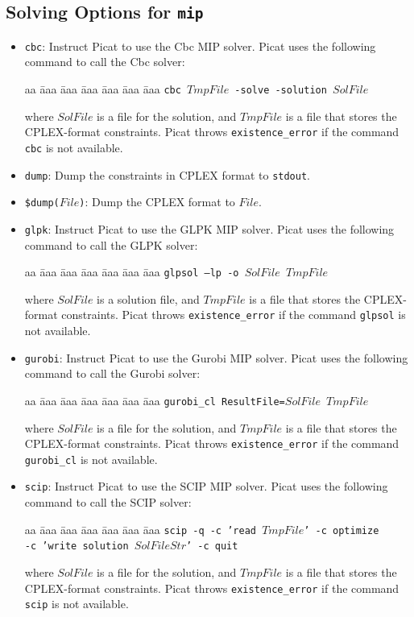 \subsection{Solving Options for \texttt{mip}}
\begin{itemize}
\item \texttt{cbc}: Instruct Picat to use the Cbc MIP solver. Picat uses the following command to call the Cbc solver:
\begin{tabbing}
aa \= aaa \= aaa \= aaa \= aaa \= aaa \= aaa \kill
\> \texttt{cbc $TmpFile$ -solve -solution $SolFile$ }
\end{tabbing}
where $SolFile$ is a file for the solution, and $TmpFile$ is a file that stores the CPLEX-format constraints. Picat throws \texttt{existence\_error} if the command \texttt{cbc} is not available.
\item \texttt{dump}: Dump the constraints in CPLEX format to \texttt{stdout}.
\item \texttt{\$dump($File$)}: Dump the CPLEX format to $File$.
\item \texttt{glpk}: Instruct Picat to use the GLPK MIP solver. Picat uses the following command to call the GLPK solver:
\begin{tabbing}
aa \= aaa \= aaa \= aaa \= aaa \= aaa \= aaa \kill
\> \texttt{glpsol --lp -o $SolFile$ $TmpFile$}
\end{tabbing}
where $SolFile$ is a solution file, and $TmpFile$ is a file that stores the CPLEX-format constraints. Picat throws \texttt{existence\_error} if the command \texttt{glpsol} is not available.
\item \texttt{gurobi}: Instruct Picat to use the Gurobi MIP solver. Picat uses the following command to call the Gurobi solver:
\begin{tabbing}
aa \= aaa \= aaa \= aaa \= aaa \= aaa \= aaa \kill
\> \texttt{gurobi\_cl ResultFile=$SolFile$ $TmpFile$}
\end{tabbing}
where $SolFile$ is a file for the solution, and $TmpFile$ is a file that stores the CPLEX-format constraints. Picat throws \texttt{existence\_error} if the command \texttt{gurobi\_cl} is not available.
\item \texttt{scip}: Instruct Picat to use the SCIP MIP solver. Picat uses the following command to call the SCIP solver:
\begin{tabbing}
aa \= aaa \= aaa \= aaa \= aaa \= aaa \= aaa \kill
\> \texttt{scip -q -c 'read $TmpFile$' -c optimize} \\
\> \> \texttt{-c 'write solution $SolFileStr$' -c quit}
\end{tabbing}
where $SolFile$ is a file for the solution, and $TmpFile$ is a file that stores the CPLEX-format constraints. Picat throws \texttt{existence\_error} if the command \texttt{scip} is not available.
\end{itemize}

